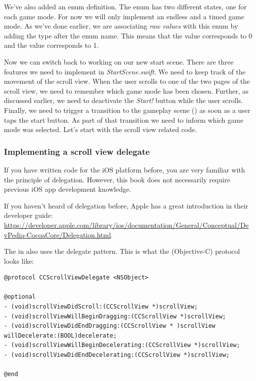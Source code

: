We've also added an enum definition. The  enum has two
different states, one for each game mode. For now we will only implement an
endless and a timed game mode. As we've done earlier, we are associating
\textit{raw values} with this enum by adding the  type after the
enum name. This means that the  value corresponds to 0 and
the  value corresponds to 1.

Now we can switch back to working on our new start scene. There are three
features we need to implement in \textit{StartScene.swift}. We need to keep
track of the movement of the scroll view. When the user scrolls to one of the
two pages of the scroll view, we need to remember which game mode has been
chosen. Further, as discussed earlier, we need to deactivate the \textit{Start!}
button while the user scrolls. Finally, we need to trigger a transition to the
gameplay scene () as soon as a user taps the start button.
As part of that transition we need to inform  which game
mode was selected. Let's start with the scroll view related code.

\subsubsection{Implementing a scroll view delegate}
If you have written code for the iOS platform before, you are very familiar with
the principle of delegation. However, this book does not necessarily require
previous iOS app development knowledge.

If you haven't heard of delegation before, Apple has a great introduction in
their developer guide:
\url{https://developer.apple.com/library/ios/documentation/General/Conceptual/DevPedia-CocoaCore/Delegation.html}.

The  in \cocos{} also uses the delegate pattern. This
is what the (Objective-C) protocol looks like:
\begin{lstlisting}
@protocol CCScrollViewDelegate <NSObject>

@optional
- (void)scrollViewDidScroll:(CCScrollView *)scrollView;
- (void)scrollViewWillBeginDragging:(CCScrollView *)scrollView;
- (void)scrollViewDidEndDragging:(CCScrollView * )scrollView willDecelerate:(BOOL)decelerate;
- (void)scrollViewWillBeginDecelerating:(CCScrollView *)scrollView;
- (void)scrollViewDidEndDecelerating:(CCScrollView *)scrollView;

@end
\end{lstlisting}

